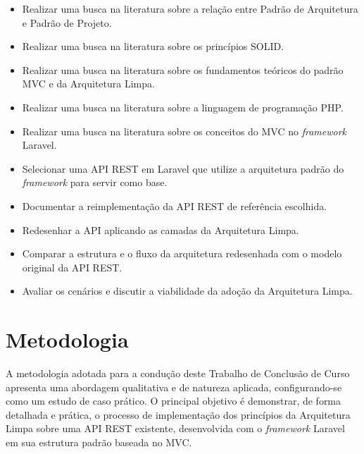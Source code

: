             \begin{itemize}

                \item Realizar uma busca na literatura sobre a relação entre Padrão de Arquitetura e Padrão de Projeto.
            
                \item Realizar uma busca na literatura sobre os princípios SOLID.
                
                \item Realizar uma busca na literatura sobre os fundamentos teóricos do padrão MVC e da Arquitetura Limpa.

                \item Realizar uma busca na literatura sobre a linguagem de programação PHP.
                
                \item Realizar uma busca na literatura sobre os conceitos do MVC no \textit{framework} Laravel.

                \item Selecionar uma API REST em Laravel que utilize a arquitetura padrão do \textit{framework} para servir como base.

                \item Documentar a reimplementação da API REST de referência escolhida.
                
                \item Redesenhar a API aplicando as camadas da Arquitetura Limpa.

                \item Comparar a estrutura e o fluxo da arquitetura redesenhada com o modelo original da API REST.

                \item Avaliar os cenários e discutir a viabilidade da adoção da Arquitetura Limpa.

            \end{itemize}
            
    \section{Metodologia}
        \par A metodologia adotada para a condução deste Trabalho de Conclusão de Curso apresenta uma abordagem qualitativa e de natureza aplicada, configurando-se como um estudo de caso prático. O principal objetivo é demonstrar, de forma detalhada e prática, o processo de implementação dos princípios da Arquitetura Limpa sobre uma API REST existente, desenvolvida com o \textit{framework} Laravel em sua estrutura padrão baseada no MVC.

